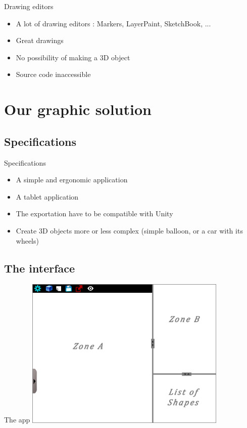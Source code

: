 \documentclass[a4paper,10pt]{beamer}
\begin{document}
			\begin{frame}{Drawing editors}
				\begin{itemize}
					\item A lot of drawing editors : Markers, LayerPaint, SketchBook, ...
					\item Great drawings
					\item No possibility of making a 3D object
					\item Source code inaccessible
				\end{itemize}
			\end{frame}
	
	\section{Our graphic solution}
		\subsection{Specifications}
		
		\begin{frame}{Specifications}
			\begin{itemize}
				\item A simple and ergonomic application
				\item A tablet application
				\item The exportation have to be compatible with Unity
				\item Create 3D objects more or less complex (simple balloon, or a car with its wheels)
			\end{itemize}
		\end{frame}
		
		\subsection{The interface}
		
			\begin{frame}{The app}
				\includegraphics[height=205pt]{maquette/maquette_1.png}
			\end{frame}
			
\end{document}
